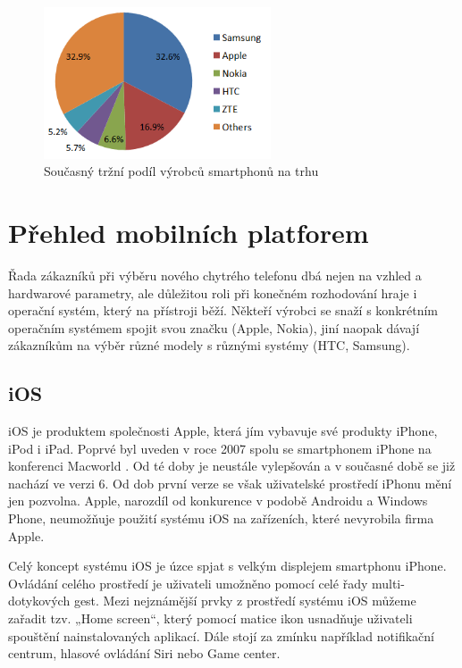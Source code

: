 \begin{figure}\centering
\includegraphics[width=0.6\textwidth]{smartphone_by_manufaturers.png}
\caption{Současný tržní podíl výrobců smartphonů na trhu}
\label{fig:VyrobciSmartphoneRozsireni2}
\end{figure}

\section{Přehled mobilních platforem}
Řada zákazníků při výběru nového chytrého telefonu dbá nejen na vzhled a hardwarové parametry, ale důležitou roli při konečném rozhodování hraje i operační systém, který na přístroji běží. Někteří výrobci se snaží s konkrétním operačním systémem spojit svou značku (Apple, Nokia), jiní naopak dávají zákazníkům na výběr různé modely s různými systémy (HTC, Samsung).

\subsection{iOS}
iOS je produktem společnosti Apple, která jím vybavuje své produkty iPhone, iPod i iPad. Poprvé byl uveden v roce 2007 spolu se smartphonem iPhone na konferenci Macworld \cite{apple_unveils_iPhone}. Od té doby je neustále vylepšován a v současné době se již nachází ve verzi 6. Od dob první verze se však uživatelské prostředí iPhonu mění jen pozvolna. Apple, narozdíl od konkurence v podobě Androidu a Windows Phone, neumožňuje použití systému iOS na zařízeních, které nevyrobila firma Apple.

Celý koncept systému iOS je úzce spjat s velkým displejem smartphonu iPhone. Ovládání celého prostředí je uživateli umožněno pomocí celé řady multi-dotykových gest. Mezi nejznámější prvky z prostředí systému iOS můžeme zařadit tzv. „Home screen“, který pomocí matice ikon usnadňuje uživateli spouštění nainstalovaných aplikací. Dále stojí za zmínku například notifikační centrum, hlasové ovládání Siri nebo Game center.

